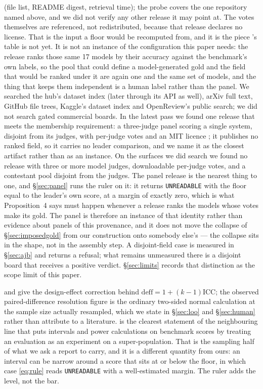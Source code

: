 \documentclass{article}
\begin{document}
\begin{description}
(file list, README digest, retrieval time); the probe covers the one repository named above, and we did not verify any other release it may point at. The votes themselves are referenced, not redistributed, because that release declares no license. That is the input a floor would be recomputed from, and it is the piece \cite{liu2025imperfect}'s table is not yet. It is not an instance of the configuration this paper needs: the release ranks those same 17 models by their accuracy against the benchmark's own labels, so the pool that could define a model-generated gold and the field that would be ranked under it are again one and the same set of models, and the thing that keeps them independent is a human label rather than the panel. We searched the hub's dataset index (later through its API as well), arXiv full text, GitHub file trees, Kaggle's dataset index and OpenReview's public search; we did not search gated commercial boards. In the latest pass we found one release that meets the membership requirement: a three-judge panel scoring a single system, disjoint from its judges, with per-judge votes and an {MIT} licence \cite{localgate2026judgepanel}; it publishes no ranked field, so it carries no leader comparison, and we name it as the closest artifact rather than as an instance. On the surfaces we did search we found no release with three or more model judges, downloadable per-judge votes, and a contestant pool disjoint from the judges. The panel release is the nearest thing to one, and \S\ref{sec:panel} runs the ruler on it: it returns \texttt{UNREADABLE} with the floor equal to the leader's own score, at a margin of exactly zero, which is what Proposition~4 says must happen whenever a release ranks the models whose votes make its gold. The panel is therefore an instance of that identity rather than evidence about panels of this provenance, and it does not move the collapse of \S\ref{sec:imposedgold} from our construction onto somebody else's --- the collapse sits in the shape, not in the assembly step. A disjoint-field case is measured in \S\ref{sec:ajb} and returns a refusal; what remains unmeasured there is a disjoint board that receives a positive verdict. \S\ref{sec:limits} records that distinction as the scope limit of this paper.
\item[Power-resolution diagnostic.] \cite{camerongelbachmiller2007} and \cite{abadie2022clustering} give the design-effect correction behind $\mathrm{deff}=1+(k-1)\mathrm{ICC}$; the observed paired-difference resolution figure is the ordinary two-sided normal calculation at the sample size actually resampled, which we state in \S\ref{sec:loo} and \S\ref{sec:human} rather than attribute to a literature. \cite{miller2024errorbars} is the clearest statement of the neighbouring line that puts intervals and power calculations on benchmark scores by treating an evaluation as an experiment on a super-population. That is the sampling half of what we ask a report to carry, and it is a different quantity from ours: an interval can be narrow around a score that sits at or below the floor, in which case \eqref{eq:rule} reads \texttt{UNREADABLE} with a well-estimated margin. The ruler adds the level, not the bar.

\end{description}
\end{document}
